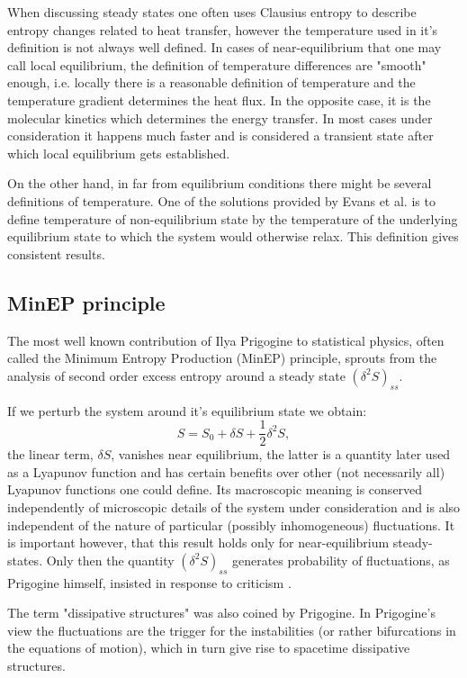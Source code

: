 \documentclass[a4paper,12pt]{article}
\begin{document}
When discussing steady states one often uses Clausius entropy to describe entropy changes related to heat transfer, however the temperature used in it's definition is not always well defined. In cases of near-equilibrium that one may call local equilibrium, the definition of temperature differences are "smooth" enough, i.e. locally there is a reasonable definition of temperature and the temperature gradient determines the heat flux. 
In the opposite case, it is the molecular kinetics which determines the energy transfer. In most cases under consideration it happens much faster and is considered a transient state after which local equilibrium gets established.

On the other hand, in far from equilibrium conditions there might be several definitions of temperature. One of the solutions provided by Evans et al. \cite{Evans:2241458} is to define temperature of non-equilibrium state by the temperature of the underlying equilibrium state to which the system would otherwise relax. This definition gives consistent results.

\subsection{MinEP principle}

The most well known contribution of Ilya Prigogine to statistical physics, often called the Minimum Entropy Production (MinEP) principle, sprouts from the analysis of second order excess entropy around a steady state $ (\delta^2 S)_{ss} $. 

If we perturb the system around it's equilibrium state we obtain:
\begin{equation}
  S=S_0 + \delta S + \frac{1}{2}\delta^2 S,
\end{equation}
the linear term, $\delta S$, vanishes near equilibrium, the latter is a quantity later used as a Lyapunov function and has certain benefits over other (not necessarily all) Lyapunov functions one could define. 
Its macroscopic meaning is conserved independently of microscopic details of the system under consideration and is also independent of the nature of particular (possibly inhomogeneous) fluctuations.
It is important however, that this result holds only for near-equilibrium steady-states. Only then the quantity $ (\delta^2 S)_{ss} $ generates probability of fluctuations, as Prigogine himself, insisted in response to criticism \cite{Nicolis:1979cv}. 

The term "dissipative structures" was also coined by Prigogine.
In Prigogine's view the fluctuations are the trigger for the instabilities (or rather bifurcations in the equations of motion), which in turn give rise to spacetime dissipative structures. 
\end{document}
